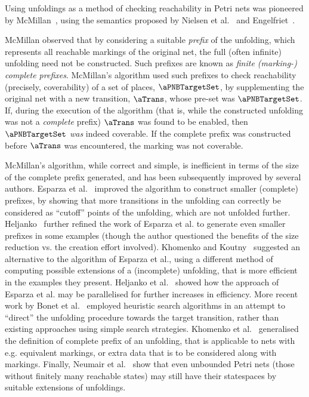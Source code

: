 Using unfoldings as a method of checking reachability in Petri nets was
pioneered by McMillan~\cite{McMillan1992}, using the semantics proposed by
{Nielsen et al.}~\cite{Nielsen1981} and Engelfriet~\cite{Engelfriet1991}.

McMillan observed that by considering a suitable \emph{prefix} of the
unfolding, which represents all reachable markings of the original net, the
full (often infinite) unfolding need not be constructed. Such prefixes are
known as \emph{finite (marking-) complete prefixes}. McMillan's algorithm used
such prefixes to check reachability (precisely, coverability) of a set of
places, $\aPNBTargetSet$, by supplementing the original net with a new
transition, $\aTrans$, whose pre-set was $\aPNBTargetSet$. If, during the
execution of the algorithm (that is, while the constructed unfolding was not a
\emph{complete} prefix) $\aTrans$ was found to be enabled, then
$\aPNBTargetSet$ \emph{was} indeed coverable. If the complete prefix was
constructed before $\aTrans$ was encountered, the marking was not coverable.

McMillan's algorithm, while correct and simple, is inefficient in terms of the
size of the complete prefix generated, and has been subsequently improved by
several authors. Esparza et al.~\cite{Esparza1996} improved the algorithm to
construct smaller (complete) prefixes, by showing that more transitions in the
unfolding can correctly be considered as ``cutoff'' points of the unfolding,
which are not unfolded further. Heljanko~\cite{Heljanko1999} further refined
the work of {Esparza et al.} to generate even smaller prefixes in some examples
(though the author questioned the benefits of the size reduction vs. the
creation effort involved). Khomenko and Koutny~\cite{Khomenko2001} suggested an
alternative to the algorithm of {Esparza et al.}, using a different method of
computing possible extensions of a (incomplete) unfolding, that is more
efficient in the examples they present. Heljanko et al.~\cite{Heljanko2002}
showed how the approach of {Esparza et al.} may be parallelised for further
increases in efficiency. More recent work by {Bonet et al.}~\cite{Bonet2008}
employed heuristic search algorithms in an attempt to ``direct'' the unfolding
procedure towards the target transition, rather than existing approaches using
simple search strategies. Khomenko et al.~\cite{Khomenko2003a}
generalised the definition of complete prefix of an unfolding, that is
applicable to nets with e.g. equivalent markings, or extra data that is to be
considered along with markings. Finally, {Neumair et al.}~\cite{Neumair2004}
show that even unbounded Petri nets (those without finitely many reachable
states) may still have their statespaces by suitable extensions of unfoldings.

